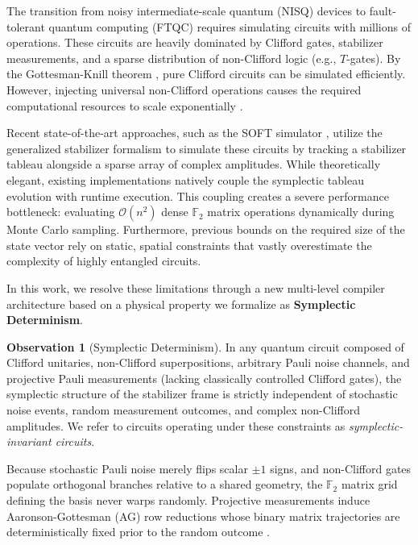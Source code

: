 \documentclass[aps,prx,reprint,superscriptaddress,nofootinbib]{revtex4-2}
\theoremstyle{definition}
\newtheorem{observation}{Observation}
\begin{document}
The transition from noisy intermediate-scale quantum (NISQ) devices to fault-tolerant quantum computing (FTQC) requires simulating circuits with millions of operations. These circuits are heavily dominated by Clifford gates, stabilizer measurements, and a sparse distribution of non-Clifford logic (e.g., $T$-gates). By the Gottesman-Knill theorem \cite{gottesman1998}, pure Clifford circuits can be simulated efficiently. However, injecting universal non-Clifford operations causes the required computational resources to scale exponentially \cite{bravyi2016}.

Recent state-of-the-art approaches, such as the SOFT simulator \cite{li2025soft}, utilize the generalized stabilizer formalism \cite{yoder2012} to simulate these circuits by tracking a stabilizer tableau alongside a sparse array of complex amplitudes. While theoretically elegant, existing implementations natively couple the symplectic tableau evolution with runtime execution. This coupling creates a severe performance bottleneck: evaluating $\mathcal{O}(n^2)$ dense $\mathbb{F}_2$ matrix operations dynamically during Monte Carlo sampling. Furthermore, previous bounds on the required size of the state vector rely on static, spatial constraints that vastly overestimate the complexity of highly entangled circuits.

In this work, we resolve these limitations through a new multi-level compiler architecture based on a physical property we formalize as \textbf{Symplectic Determinism}.

\begin{observation}[Symplectic Determinism]
In any quantum circuit composed of Clifford unitaries, non-Clifford superpositions, arbitrary Pauli noise channels, and projective Pauli measurements (lacking classically controlled Clifford gates), the symplectic structure of the stabilizer frame is strictly independent of stochastic noise events, random measurement outcomes, and complex non-Clifford amplitudes. We refer to circuits operating under these constraints as \textit{symplectic-invariant circuits}.
\end{observation}

Because stochastic Pauli noise merely flips scalar $\pm 1$ signs, and non-Clifford gates populate orthogonal branches relative to a shared geometry, the $\mathbb{F}_2$ matrix grid defining the basis never warps randomly. Projective measurements induce Aaronson-Gottesman (AG) row reductions whose binary matrix trajectories are deterministically fixed prior to the random outcome \cite{aaronson2004}.
\end{document}

